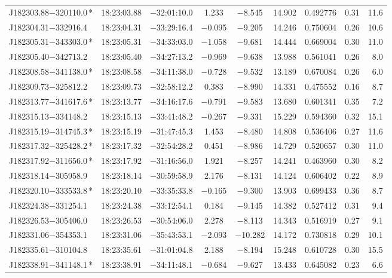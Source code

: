 \begin{table*}
\begin{tabular}{lcccccccr}
J182303.88$-$320110.0\,* & 18:23:03.88 & $-$32:01:10.0 &  1.233 & $-$8.545 & 14.902 & 0.492776 & 0.31 & 11.6 \\
J182304.31$-$332916.4 & 18:23:04.31 & $-$33:29:16.4 & $-$0.095 & $-$9.205 & 14.246 & 0.750604 & 0.26 & 10.6 \\
J182305.31$-$343303.0\,* & 18:23:05.31 & $-$34:33:03.0 & $-$1.058 & $-$9.681 & 14.444 & 0.669004 & 0.30 & 11.0 \\
J182305.40$-$342713.2 & 18:23:05.40 & $-$34:27:13.2 & $-$0.969 & $-$9.638 & 13.988 & 0.561041 & 0.26 & 8.0 \\
J182308.58$-$341138.0\,* & 18:23:08.58 & $-$34:11:38.0 & $-$0.728 & $-$9.532 & 13.189 & 0.670084 & 0.26 & 6.0 \\
J182309.73$-$325812.2 & 18:23:09.73 & $-$32:58:12.2 &  0.383 & $-$8.990 & 14.331 & 0.475552 & 0.16 & 8.7 \\
J182313.77$-$341617.6\,* & 18:23:13.77 & $-$34:16:17.6 & $-$0.791 & $-$9.583 & 13.680 & 0.601341 & 0.35 & 7.2 \\
J182315.13$-$334148.2 & 18:23:15.13 & $-$33:41:48.2 & $-$0.267 & $-$9.331 & 15.229 & 0.594360 & 0.32 & 15.1 \\
J182315.19$-$314745.3\,* & 18:23:15.19 & $-$31:47:45.3 &  1.453 & $-$8.480 & 14.808 & 0.536406 & 0.27 & 11.6 \\
J182317.32$-$325428.2\,* & 18:23:17.32 & $-$32:54:28.2 &  0.451 & $-$8.986 & 14.729 & 0.520657 & 0.30 & 11.0 \\
J182317.92$-$311656.0\,* & 18:23:17.92 & $-$31:16:56.0 &  1.921 & $-$8.257 & 14.241 & 0.463960 & 0.30 & 8.2 \\
J182318.14$-$305958.9 & 18:23:18.14 & $-$30:59:58.9 &  2.176 & $-$8.131 & 14.124 & 0.606402 & 0.22 & 8.9 \\
J182320.10$-$333533.8\,* & 18:23:20.10 & $-$33:35:33.8 & $-$0.165 & $-$9.300 & 13.903 & 0.699433 & 0.36 & 8.7 \\
J182324.38$-$331254.1 & 18:23:24.38 & $-$33:12:54.1 &  0.184 & $-$9.145 & 14.382 & 0.527412 & 0.31 & 9.4 \\
J182326.53$-$305406.0 & 18:23:26.53 & $-$30:54:06.0 &  2.278 & $-$8.113 & 14.343 & 0.516919 & 0.27 & 9.1 \\
J182331.06$-$354353.1 & 18:23:31.06 & $-$35:43:53.1 & $-$2.093 & $-$10.282 & 14.172 & 0.730818 & 0.29 & 10.1 \\
J182335.61$-$310104.8 & 18:23:35.61 & $-$31:01:04.8 &  2.188 & $-$8.194 & 15.248 & 0.610728 & 0.30 & 15.5 \\
J182338.91$-$341148.1\,* & 18:23:38.91 & $-$34:11:48.1 & $-$0.684 & $-$9.627 & 13.433 & 0.645082 & 0.23 & 6.6 \\

\end{tabular}
\end{table*}
